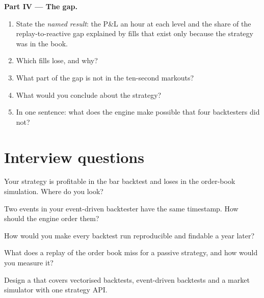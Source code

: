 \begin{problem}
\medskip\noindent\textbf{Part IV --- The gap.}
\begin{enumerate}[resume]
\item State the \emph{named result}: the P\&L an hour at each level and the share of the replay-to-reactive gap explained by fills that
exist only because the strategy was in the book.
\item Which fills lose, and why?
\item What part of the gap is not in the ten-second markouts?
\item What would you conclude about the strategy?
\item In one sentence: what does the engine make possible that four backtesters did not?
\end{enumerate}
\end{problem}

\section{Interview questions}

\begin{interviewq}\label{iq:pl:backtest-engine-architecture:1}
Your strategy is profitable in the bar backtest and loses in the order-book simulation. Where do you look?
\end{interviewq}

\begin{interviewq}\label{iq:pl:backtest-engine-architecture:2}
Two events in your event-driven backtester have the same timestamp. How should the engine order them?
\end{interviewq}

\begin{interviewq}\label{iq:pl:backtest-engine-architecture:3}
How would you make every backtest run reproducible and findable a year later?
\end{interviewq}

\begin{interviewq}\label{iq:pl:backtest-engine-architecture:4}
What does a replay of the order book miss for a passive strategy, and how would you measure it?
\end{interviewq}

\begin{interviewq}\label{iq:pl:backtest-engine-architecture:5}
Design a  that covers vectorised backtests, event-driven backtests and a market simulator with one strategy API.
\end{interviewq}
